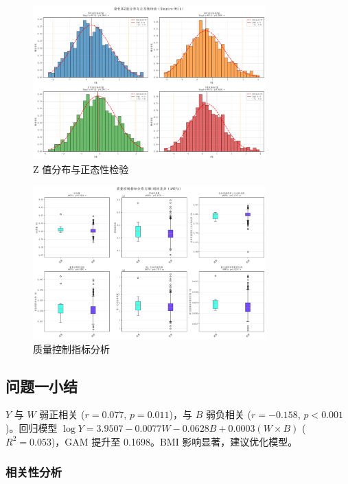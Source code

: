 \documentclass[withoutpreface,bwprint]{cumcmthesis} %
\begin{document}
\begin{figure}[h]
    \centering
    \includegraphics[width=0.8\textwidth]{../code/fig-1-3-chromosome_zvalue_distribution_with_normtest.png}
    \caption{Z 值分布与正态性检验}
    \label{fig:zdist}
\end{figure}

\begin{figure}[h]
    \centering
    \includegraphics[width=0.8\textwidth]{../code/fig-1-4-quality_control_with_anova.png}
    \caption{质量控制指标分析}
    \label{fig:qc}
\end{figure}

\subsection{问题一小结}

$Y$ 与 $W$ 弱正相关 ($r=0.077$, $p=0.011$)，与 $B$ 弱负相关 ($r=-0.158$, $p<0.001$)。回归模型 $\log Y = 3.9507 - 0.0077 W - 0.0628 B + 0.0003 (W \times B)$ ($R^2=0.053$)，GAM 提升至 0.1698。BMI 影响显著，建议优化模型。




\subsubsection{相关性分析}
\end{document}
